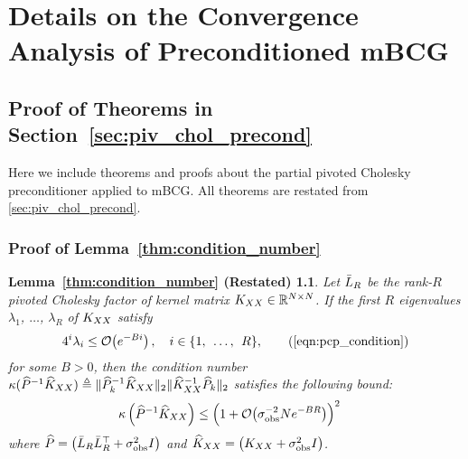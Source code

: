\chapter{Details on the Convergence Analysis of Preconditioned mBCG}

\section{Proof of Theorems in Section~\ref{sec:piv_chol_precond}}
\label{app:proofs}
Here we include theorems and proofs about the partial pivoted Cholesky preconditioner applied to mBCG.
All theorems are restated from \cref{sec:piv_chol_precond}.


\subsection{Proof of Lemma~\ref{thm:condition_number}}
\newtheorem*{thm:condition_number}{Lemma~\ref{thm:condition_number} (Restated)}
\begin{thm:condition_number}
  Let $\bar{L}_{R}$ be the rank-$R$ pivoted Cholesky factor of kernel matrix $K_{XX} \in \mathbb{R}^{N \times N}$.
  If the first $R$ eigenvalues $\lambda_1$, $\ldots$, $\lambda_R$ of $K_{XX}$ satisfy
	\begin{equation*}
		4^{i}\lambda_{i} \leq \bigo{e^{-Bi}}, \quad i \in \{ 1, \:\: \ldots, \:\: R \},
		\tag{\ref{eqn:pcp_condition}}
	\end{equation*}
	for some $B>0$, then the condition number $\kappa(\widehat{P}^{-1}\widehat{K}_{XX}) \triangleq \Vert \widehat{P}_{k}^{-1}\widehat{K}_{XX} \Vert_{2} \Vert \widehat{K}_{XX}^{-1}\widehat{P}_{k} \Vert_{2}$
	satisfies the following bound:
  \begin{align}
    \kappa \left( \trainP^{-1}\trainK \right)
    &\leq \Bigl( 1 + \bigo{\sigma^{-2}_\text{obs} N e^{-BR}} \Bigr)^2
		\nonumber
  \end{align}
	where $\widehat{P} = \left( \bar{L}_R \bar{L}_R^\top + \sigma^2_\text{obs} I \right)$ and $\widehat{K}_{XX} = \left( K_{XX} + \sigma^2_\text{obs} I \right)$.
\end{thm:condition_number}

